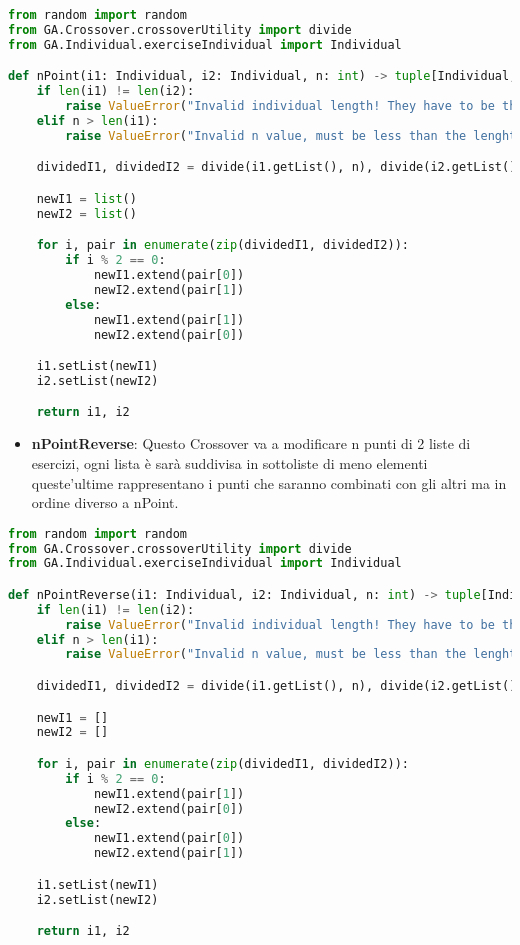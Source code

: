 \documentclass{article}
\begin{document}
\begin{lstlisting}[language=Python, breaklines, no caption]
from random import random
from GA.Crossover.crossoverUtility import divide
from GA.Individual.exerciseIndividual import Individual

def nPoint(i1: Individual, i2: Individual, n: int) -> tuple[Individual, Individual]:
    if len(i1) != len(i2):
        raise ValueError("Invalid individual length! They have to be the same.")
    elif n > len(i1):
        raise ValueError("Invalid n value, must be less than the lenght of the individual!")

    dividedI1, dividedI2 = divide(i1.getList(), n), divide(i2.getList(), n)

    newI1 = list()
    newI2 = list()

    for i, pair in enumerate(zip(dividedI1, dividedI2)):
        if i % 2 == 0:
            newI1.extend(pair[0])
            newI2.extend(pair[1])
        else:
            newI1.extend(pair[1])
            newI2.extend(pair[0])

    i1.setList(newI1)
    i2.setList(newI2)

    return i1, i2
        \end{lstlisting}

\pagebreak

\begin{itemize}
\item\textbf{nPointReverse}: Questo Crossover va a modificare n punti di 2 liste di esercizi, ogni lista è sarà suddivisa in sottoliste di meno elementi queste'ultime rappresentano i punti che saranno combinati con gli altri ma in ordine diverso a nPoint.
\end{itemize}

\begin{lstlisting}[language=Python, breaklines, no caption]
from random import random
from GA.Crossover.crossoverUtility import divide
from GA.Individual.exerciseIndividual import Individual

def nPointReverse(i1: Individual, i2: Individual, n: int) -> tuple[Individual, Individual]:
    if len(i1) != len(i2):
        raise ValueError("Invalid individual length! They have to be the same.")
    elif n > len(i1):
        raise ValueError("Invalid n value, must be less than the lenght of the individual!")

    dividedI1, dividedI2 = divide(i1.getList(), n), divide(i2.getList(), n)

    newI1 = []
    newI2 = []

    for i, pair in enumerate(zip(dividedI1, dividedI2)):
        if i % 2 == 0:
            newI1.extend(pair[1])
            newI2.extend(pair[0])
        else:
            newI1.extend(pair[0])
            newI2.extend(pair[1])

    i1.setList(newI1)
    i2.setList(newI2)

    return i1, i2
\end{lstlisting}
\end{document}
